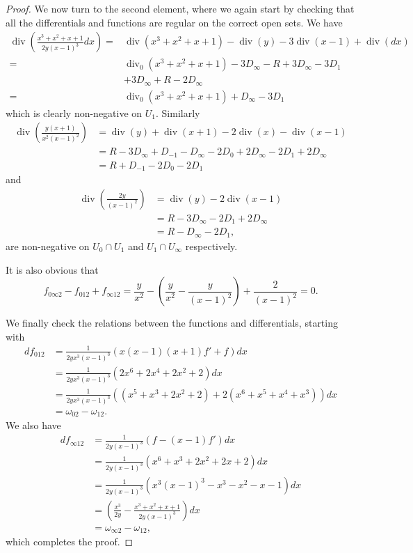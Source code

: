 \documentclass[draft, 11pt]{article} %
\theoremstyle{plain}
\theoremstyle{remark}
\DeclareMathOperator{\di}{div}
\begin{document}
\begin{proof}
We now turn to the second element, where we again start by checking that all the differentials and functions are regular on the correct open sets.
We have
\begin{align}
\di \left( \frac{x^3 + x^2 + x + 1}{2y(x-1)^3} dx \right) = & \di(x^3+x^2+x+1) -\di(y) - 3\di(x-1) + \di(dx) \\
= & \di_0(x^3 + x^2 + x + 1) - 3D_\infty - R + 3D_\infty - 3D_1 \\
& + 3D_\infty + R - 2D_\infty \\
 = &  \di_0(x^3 + x^2 + x + 1) + D_\infty - 3D_1
\end{align}
which is clearly non-negative on $U_1$.
Similarly
\begin{align}
\di \left( \frac{y(x+1)}{x^2(x-1)^2} \right) & = \di(y) + \di(x+1) - 2\di(x) - \di(x-1) \\
& = R - 3D_\infty + D_{-1} -D_\infty -2D_0 + 2D_\infty - 2D_1 + 2D_\infty \\
& = R + D_{-1} - 2D_0 - 2D_1
\end{align}
and
\begin{align}
\di \left( \frac{2y}{(x-1)^2} \right) & = \di(y) - 2\di(x-1) \\
& = R - 3D_\infty - 2D_1 + 2D_\infty \\
& = R - D_\infty - 2D_1,
\end{align}
are non-negative on $U_0 \cap U_1$ and $U_1 \cap U_\infty$ respectively.

It is also obvious that
\[
f_{0 \infty 2} - f_{0 1 2 } + f_{\infty 1 2} = \frac{y}{x^2} - \left( \frac{y}{x^2} - \frac{y}{(x-1)^2} \right) + \frac{2}{(x-1)^2} = 0.
\]

We finally check the relations between the functions and differentials, starting with
\begin{align}
df_{0 1 2} & = \frac{1}{2yx^3(x-1)^3} (x(x-1)(x+1)f' + f)dx \\
& = \frac{1}{2yx^3(x-1)^3}(2x^6 + 2x^4 + 2x^2 + 2)dx \\
& = \frac{1}{2yx^3(x-1)^3}((x^5 + x^3 + 2x^2 + 2) + 2(x^6 + x^5 + x^4 + x^3))dx \\
& = \omega_{02} - \omega_{12}.
\end{align}
We also have
\begin{align}
df_{\infty 1 2} & = \frac{1}{2y(x-1)^3}(f-(x-1)f')dx \\
& = \frac{1}{2y(x-1)^3}(x^6 + x^3 + 2x^2 + 2x+ 2)dx \\
& = \frac{1}{2y(x-1)^3}(x^3(x-1)^3 - x^3 - x^2 - x - 1) dx \\
& = \left(\frac{x^3}{2y} - \frac{x^3 + x^2 + x+1}{2y(x-1)^3}\right) dx \\
& = \omega_{\infty 2} - \omega_{12},
\end{align}
which completes the proof.

\end{proof}
\end{document}
